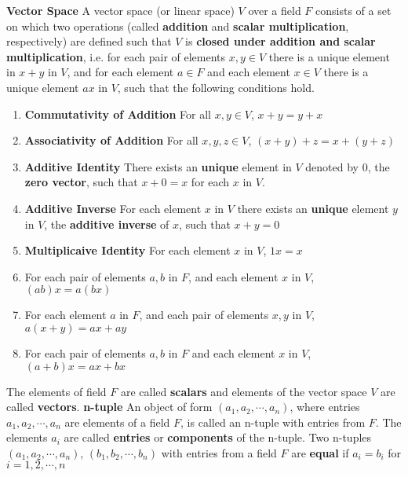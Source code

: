 \documentclass[11pt]{article}
\begin{document}

\begin{defn*}
    \textbf{Vector Space} A vector space (or linear space) $V$ over a field $F$ consists of a set on which two operations (called \textbf{addition} and \textbf{scalar multiplication}, respectively) are defined such that $V$ is \textbf{closed under addition and scalar multiplication}, i.e. for each pair of elements $x,y\in V$ there is a unique element in $x+y$ in $V$, and for each element $a\in F$ and each element $x\in V$ there is a unique element $ax$ in $V$, such that the following conditions hold. 
    \begin{enumerate}
        \item \textbf{Commutativity of Addition} For all $x,y\in V$, $x+y = y+x$ 
        \item \textbf{Associativity of Addition} For all $x,y,z\in V$, $(x+y)+z = x+(y+z)$
        \item \textbf{Additive Identity} There exists an \textbf{unique} element in $V$ denoted by 0, the \textbf{zero vector}, such that $x+0 = x$ for each $x$ in $V$.
        \item \textbf{Additive Inverse} For each element $x$ in $V$ there exists an \textbf{unique} element $y$ in $V$, the \textbf{additive inverse} of $x$, such that $x+y=0$ 
        \item \textbf{Multiplicaive Identity} For each element $x$ in $V$, $1x = x$
        \item For each pair of elements $a,b$ in $F$, and each element $x$ in $V$, $(ab)x = a(bx)$ 
        \item For each element $a$ in $F$, and each pair of elements $x,y$ in $V$, $a(x+y) = ax+ay$ 
        \item For each pair of elements $a,b$ in $F$ and each element $x$ in $V$, $(a+b)x = ax+bx$
    \end{enumerate}
    The elements of field $F$ are called \textbf{scalars} and elements of the vector space $V$ are called \textbf{vectors}. \textbf{n-tuple} An object of form $(a_1, a_2, \cdots, a_n)$, where entries $a_1, a_2, \cdots, a_n$ are elements of a field $F$, is called an n-tuple with entries from $F$. The elements $a_i$ are called \textbf{entries} or \textbf{components} of the n-tuple. Two n-tuples $(a_1, a_2, \cdots, a_n)$, $(b_1, b_2, \cdots, b_n)$ with entries from a field $F$ are \textbf{equal} if $a_i = b_i$ for $i=1,2,\cdots, n$
\end{defn*}
\end{document}
